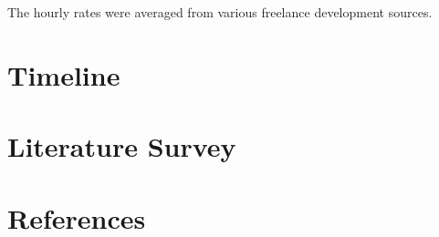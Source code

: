 \documentclass{article}
\begin{document}
The hourly rates were averaged from various freelance development sources.

\section{Timeline}



\section{Literature Survey}

\section{References}
\end{document}
